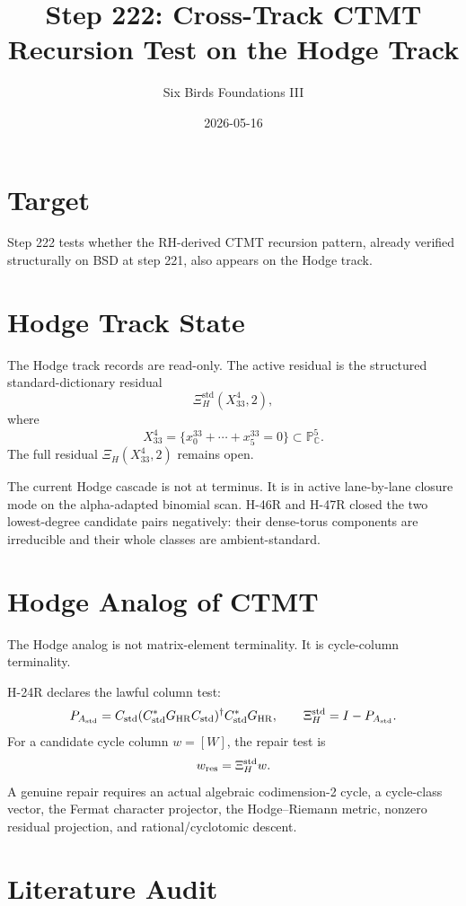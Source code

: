 \documentclass{article}
\title{Step 222: Cross-Track CTMT Recursion Test on the Hodge Track}
\author{Six Birds Foundations III}
\date{2026-05-16}
\begin{document}
\maketitle

\section{Target}

Step 222 tests whether the RH-derived CTMT recursion pattern, already verified structurally on BSD at step 221, also appears on the Hodge track.

\section{Hodge Track State}

The Hodge track records are read-only. The active residual is the structured standard-dictionary residual
\[
\Xi_H^{\mathrm{std}}(X^4_{33},2),
\]
where
\[
X^4_{33}=\{x_0^{33}+\cdots+x_5^{33}=0\}\subset \mathbb P^5_{\mathbb C}.
\]
The full residual \(\Xi_H(X^4_{33},2)\) remains open.

The current Hodge cascade is not at terminus. It is in active lane-by-lane closure mode on the alpha-adapted binomial scan. H-46R and H-47R closed the two lowest-degree candidate pairs negatively: their dense-torus components are irreducible and their whole classes are ambient-standard.

\section{Hodge Analog of CTMT}

The Hodge analog is not matrix-element terminality. It is cycle-column terminality.

H-24R declares the lawful column test:
\[
P_{A_{\rm std}}
=
C_{\rm std}(C_{\rm std}^{*}G_{\rm HR}C_{\rm std})^{\dagger}
C_{\rm std}^{*}G_{\rm HR},
\qquad
\Xi_H^{\rm std}=I-P_{A_{\rm std}}.
\]
For a candidate cycle column \(w=[W]\), the repair test is
\[
w_{\rm res}=\Xi_H^{\rm std}w.
\]
A genuine repair requires an actual algebraic codimension-2 cycle, a cycle-class vector, the Fermat character projector, the Hodge--Riemann metric, nonzero residual projection, and rational/cyclotomic descent.

\section{Literature Audit}
\end{document}
